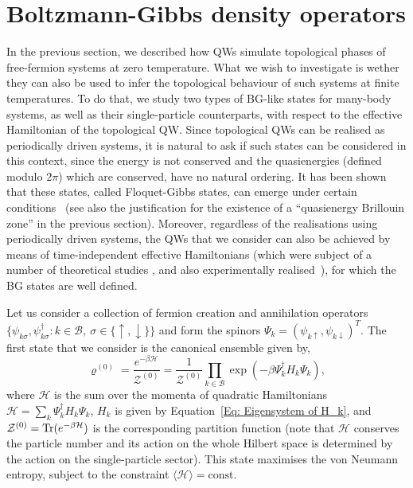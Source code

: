 \section{Boltzmann-Gibbs density operators}
\label{sec:density_operators}
In the previous section, we described how QWs simulate topological phases of free-fermion systems at zero temperature. What we wish to investigate is wether they can also be used to infer the topological behaviour of such systems at finite temperatures. To do that, we study two types of BG-like states for many-body systems, as well as their single-particle counterparts, with respect to the effective Hamiltonian of the topological QW. Since topological QWs can be realised as periodically driven systems, it is natural to ask if such states can be considered in this context, since the energy is not conserved and the quasienergies (defined modulo $2\pi$) which are conserved, have no natural ordering. It has been shown that these states, called Floquet-Gibbs states, can emerge under certain conditions~\cite{shi:mor:miy:15,shi:thi:mor:han:may:16} (see also the justification for the existence of a ``quasienergy Brillouin zone'' in the previous section). Moreover, regardless of the realisations using periodically driven systems, the QWs that we consider can also be achieved by means of time-independent effective Hamiltonians (which were subject of a number of theoretical studies \cite{kit:rud:ber:dem:10,asb:12,asb:obu:13}, and also experimentally realised~\cite{kit:exp:12,bar:exp:16}), for which the BG states are well defined.

Let us consider a collection of fermion creation and annihilation operators $\{\psi_{k\sigma},\psi^{\dagger}_{k\sigma}: k \in \mathcal B,\ \sigma\in\{\uparrow,\downarrow\}\}$ and form the spinors $\Psi_k=(\psi_{k\uparrow},\psi_{k\downarrow})^T$.
The first state that we consider is the canonical ensemble given by,
\begin{equation}
\label{varrho_0}
\varrho^{(0)}=\frac{e^{-\beta \mathcal{H}}}{\mathcal{Z}^{(0)}} = \frac{1}{\mathcal{Z}^{(0)}}\prod_{k\in \mathcal{B}} \exp(-\beta \Psi_k^{\dagger} H_k\Psi_k),	
\end{equation}
where $\mathcal{H}$ is the sum over the momenta of quadratic Hamiltonians $\mathcal{H} =\sum_k \Psi^{\dagger}_k H_k \Psi_k$, $H_k$ is given by Equation~\eqref{Eq: Eigensystem of H_k}, and $\mathcal{Z}^{(0)} = \text{Tr}(e^{-\beta\mathcal{H}})$ is the corresponding partition function (note that $\mathcal{H}$ conserves the particle number and its action on the whole Hilbert space is determined by the action on the single-particle sector). This state maximises the von Neumann entropy, subject to the constraint $\langle\mathcal{H}\rangle=\text{const}$.

